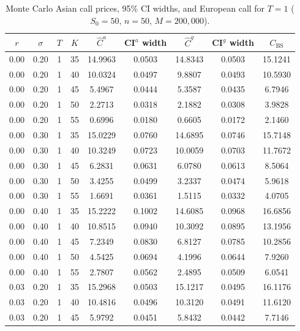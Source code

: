 \documentclass[11pt,a4paper]{article}
\theoremstyle{plain}
\theoremstyle{definition}
\begin{document}
\begin{table}[H]
  \centering
  \caption{Monte Carlo Asian call prices, 95\% CI widths, and European call
           for $T=1$ ($S_0=50$, $n=50$, $M=200{,}000$).}
  \label{tab:mc-prices-1}
  \small
  \renewcommand{\arraystretch}{1.1}
  \begin{tabular}{cccc|cc|cc|c}
    \toprule
    $r$ & $\sigma$ & $T$ & $K$
      & $\hat{C}^{a}$ & CI$^{a}$ width
      & $\hat{C}^{g}$ & CI$^{g}$ width
      & $C_{\mathrm{BS}}$ \\
    \midrule
    0.00 & 0.20 & 1 & 35 & 14.9963 & 0.0503 & 14.8343 & 0.0503 & 15.1241 \\
    0.00 & 0.20 & 1 & 40 & 10.0324 & 0.0497 &  9.8807 & 0.0493 & 10.5930 \\
    0.00 & 0.20 & 1 & 45 &  5.4967 & 0.0444 &  5.3587 & 0.0435 &  6.7946 \\
    0.00 & 0.20 & 1 & 50 &  2.2713 & 0.0318 &  2.1882 & 0.0308 &  3.9828 \\
    0.00 & 0.20 & 1 & 55 &  0.6996 & 0.0180 &  0.6605 & 0.0172 &  2.1460 \\
    \midrule
    0.00 & 0.30 & 1 & 35 & 15.0229 & 0.0760 & 14.6895 & 0.0746 & 15.7148 \\
    0.00 & 0.30 & 1 & 40 & 10.3249 & 0.0723 & 10.0059 & 0.0703 & 11.7672 \\
    0.00 & 0.30 & 1 & 45 &  6.2831 & 0.0631 &  6.0780 & 0.0613 &  8.5064 \\
    0.00 & 0.30 & 1 & 50 &  3.4255 & 0.0499 &  3.2337 & 0.0474 &  5.9618 \\
    0.00 & 0.30 & 1 & 55 &  1.6691 & 0.0361 &  1.5115 & 0.0332 &  4.0705 \\
    \midrule
    0.00 & 0.40 & 1 & 35 & 15.2222 & 0.1002 & 14.6085 & 0.0968 & 16.6856 \\
    0.00 & 0.40 & 1 & 40 & 10.8515 & 0.0940 & 10.3092 & 0.0895 & 13.1956 \\
    0.00 & 0.40 & 1 & 45 &  7.2349 & 0.0830 &  6.8127 & 0.0785 & 10.2856 \\
    0.00 & 0.40 & 1 & 50 &  4.5425 & 0.0694 &  4.1996 & 0.0644 &  7.9260 \\
    0.00 & 0.40 & 1 & 55 &  2.7807 & 0.0562 &  2.4895 & 0.0509 &  6.0541 \\
    \midrule
    0.03 & 0.20 & 1 & 35 & 15.2968 & 0.0503 & 15.1217 & 0.0495 & 16.1176 \\
    0.03 & 0.20 & 1 & 40 & 10.4816 & 0.0496 & 10.3120 & 0.0491 & 11.6120 \\
    0.03 & 0.20 & 1 & 45 &  5.9792 & 0.0451 &  5.8432 & 0.0442 &  7.7146 \\

\end{tabular}
\end{table}
\end{document}
